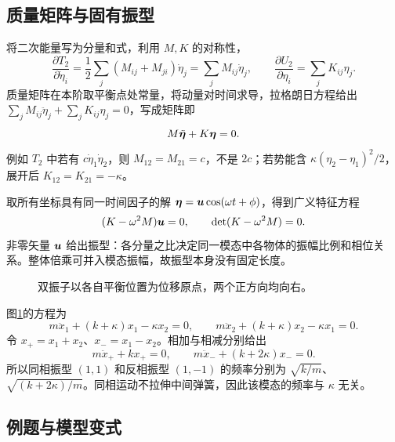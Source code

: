\subsection{质量矩阵与固有振型}
将二次能量写为分量和式，利用 $M,K$ 的对称性，
\[
\frac{\partial T_2}{\partial\dot\eta_i}
=\frac12\sum_j(M_{ij}+M_{ji})\dot\eta_j=\sum_jM_{ij}\dot\eta_j,
\qquad
\frac{\partial U_2}{\partial\eta_i}=\sum_jK_{ij}\eta_j.
\]
质量矩阵在本阶取平衡点处常量，将动量对时间求导，拉格朗日方程给出 $\sum_jM_{ij}\ddot\eta_j+\sum_jK_{ij}\eta_j=0$，写成矩阵即
\begin{equation}
M\ddot{\bm{\eta}}+K\bm{\eta}=0.
\label{sup4:eq:d7-matrix}
\end{equation}
例如 $T_2$ 中若有 $c\dot\eta_1\dot\eta_2$，则 $M_{12}=M_{21}=c$，不是 $2c$；若势能含 $\kappa(\eta_2-\eta_1)^2/2$，展开后 $K_{12}=K_{21}=-\kappa$。

取所有坐标具有同一时间因子的解 $\bm{\eta}=\bm{u}\cos(\omega t+\phi)$，得到广义特征方程
\begin{equation}
(K-\omega^2M)\bm{u}=0,\qquad
\det(K-\omega^2M)=0.
\label{sup4:eq:d7-eigen}
\end{equation}
非零矢量 $\bm{u}$ 给出振型：各分量之比决定同一模态中各物体的振幅比例和相位关系。整体倍乘可并入模态振幅，故振型本身没有固定长度。
\begin{figure}[H]\centering
{}
\caption{双振子以各自平衡位置为位移原点，两个正方向均向右。}\label{sup4:fig:d7-pair}
\end{figure}
图\ref{sup4:fig:d7-pair}的方程为
\[
m\ddot x_1+(k+\kappa)x_1-\kappa x_2=0,\qquad
m\ddot x_2+(k+\kappa)x_2-\kappa x_1=0.
\]
令 $x_+=x_1+x_2$、$x_-=x_1-x_2$。相加与相减分别给出
\[
m\ddot x_++kx_+=0,\qquad
m\ddot x_-+(k+2\kappa)x_-=0.
\]
所以同相振型 $(1,1)$ 和反相振型 $(1,-1)$ 的频率分别为 $\sqrt{k/m}$、$\sqrt{(k+2\kappa)/m}$。同相运动不拉伸中间弹簧，因此该模态的频率与 $\kappa$ 无关。


\subsection{例题与模型变式}

